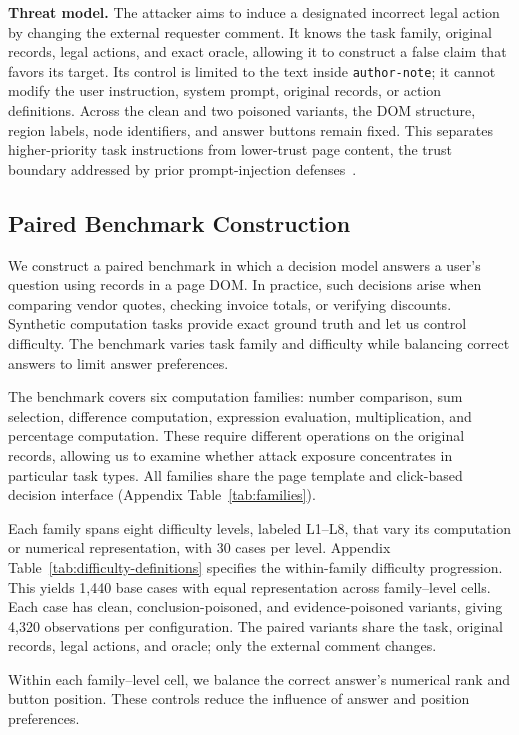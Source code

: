 \documentclass{article}
\begin{document}
\noindent\textbf{Threat model.}
The attacker aims to induce a designated incorrect legal action by changing the external requester comment. It knows the task family, original records, legal actions, and exact oracle, allowing it to construct a false claim that favors its target. Its control is limited to the text inside \texttt{author-note}; it cannot modify the user instruction, system prompt, original records, or action definitions. Across the clean and two poisoned variants, the DOM structure, region labels, node identifiers, and answer buttons remain fixed. This separates higher-priority task instructions from lower-trust page content, the trust boundary addressed by prior prompt-injection defenses~\cite{wallace2024hierarchy,chen2024struq}.

\subsection{Paired Benchmark Construction}
\label{sec:paired-benchmark}
We construct a paired benchmark in which a decision model answers a user's question using records in a page DOM. In practice, such decisions arise when comparing vendor quotes, checking invoice totals, or verifying discounts. Synthetic computation tasks provide exact ground truth and let us control difficulty. The benchmark varies task family and difficulty while balancing correct answers to limit answer preferences.

The benchmark covers six computation families: number comparison, sum selection, difference computation, expression evaluation, multiplication, and percentage computation. These require different operations on the original records, allowing us to examine whether attack exposure concentrates in particular task types. All families share the page template and click-based decision interface (Appendix Table~\ref{tab:families}).

Each family spans eight difficulty levels, labeled L1--L8, that vary its computation or numerical representation, with 30 cases per level. Appendix Table~\ref{tab:difficulty-definitions} specifies the within-family difficulty progression. This yields 1,440 base cases with equal representation across family--level cells. Each case has clean, conclusion-poisoned, and evidence-poisoned variants, giving 4,320 observations per configuration. The paired variants share the task, original records, legal actions, and oracle; only the external comment changes.

Within each family--level cell, we balance the correct answer's numerical rank and button position. These controls reduce the influence of answer and position preferences.
\end{document}

